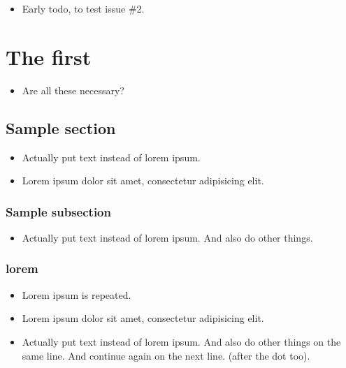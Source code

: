     \begin{itemize}[noitemsep]
        \item {\color{red}Early todo, to test issue \#2.}
    \end{itemize}
\chapter{The first}
\label{autosec:0}
    \begin{itemize}[noitemsep]
        \item {\color{ForestGreen}Are all these necessary?}
    \end{itemize}
\section{Sample section}
\label{autosec:1}
    \begin{itemize}[noitemsep]
        \item {\color{red}Actually put text instead of lorem ipsum.}
        \item Lorem ipsum dolor sit amet, consectetur adipisicing elit.
    \end{itemize}
\subsection{Sample subsection}
\label{autosec:2}
    \begin{itemize}[noitemsep]
        \item {\color{red}Actually put text instead of lorem ipsum.}
{\color{red}And also do other things.}
    \end{itemize}
\subsection{lorem}
\label{autosec:3}
    \begin{itemize}[noitemsep]
        \item {\color{DarkOrchid}Lorem ipsum is repeated.}
        \item Lorem ipsum dolor sit amet, consectetur adipisicing elit.
        \item {\color{red}Actually put text instead of lorem ipsum. And also do other things on the same line.}
{\color{red}And continue again on the next line. (after the dot too).}
    \end{itemize}
